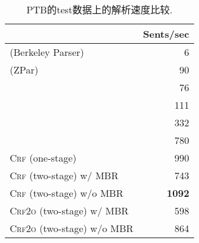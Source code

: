 \begin{table}[tb]
    \setlength{\tabcolsep}{15pt}
    \centering
    \caption{PTB的test数据上的解析速度比较.}
    \begin{tabular}{lr}
        \toprule
                                                             & Sents/sec     \\
        \midrule
        \cite{petrov-klein-2007-improved}  (Berkeley Parser) & 6             \\
        \cite{zhu-etal-2013-fast} (ZPar)                     & 90            \\
        \cite{stern-etal-2017-minimal}                       & 76            \\
        \cite{shen-etal-2018-straight}                       & 111           \\
        \cite{kitaev-klein-2018-constituency}                & 332           \\
        \cite{gomez-rodriguez-vilares-2018-constituent}      & 780           \\[3pt]
        \textsc{Crf} (one-stage)                             & 990           \\
        \textsc{Crf} (two-stage) w/ MBR                      & 743           \\
        \textsc{Crf} (two-stage) w/o MBR                     & \textbf{1092} \\
        \textsc{Crf2o} (two-stage) w/ MBR                    & 598           \\
        \textsc{Crf2o} (two-stage) w/o MBR                   & 864           \\

        \bottomrule
    \end{tabular}
    \label{table:speed}
\end{table}